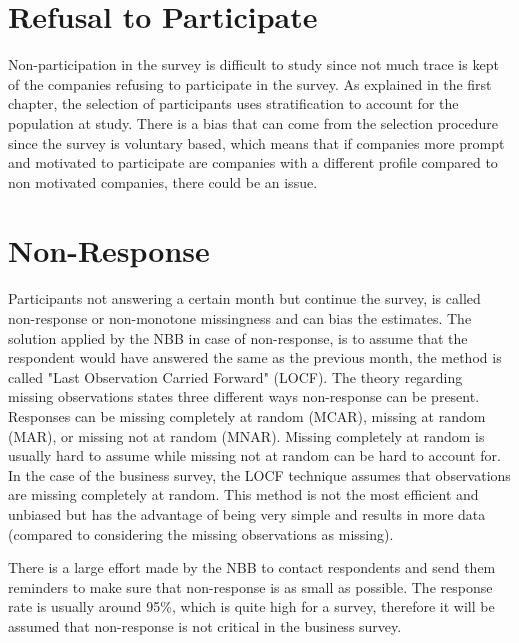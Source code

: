 \documentclass[12pt,a4paper,oneside]{book}
\begin{document}


\section{Refusal to Participate}

Non-participation in the survey is difficult to study since not much trace is kept of the companies refusing to participate in the survey. As explained in the first chapter, the selection of participants uses stratification to account for the population at study.
There is a bias that can come from the selection procedure since the survey is voluntary based, which means that if companies more prompt and motivated to participate are companies with a different profile compared to non motivated companies, there could be an issue.


\section{Non-Response}

Participants not answering a certain month but continue the survey, is called non-response or non-monotone missingness and can bias the estimates.
The solution applied by the NBB in case of non-response, is to assume that the respondent would have answered the same as the previous month, the method is called "Last Observation Carried Forward" (LOCF). 
The theory regarding missing observations states three different ways non-response can be present. Responses can be missing completely at random (MCAR), missing at random (MAR), or missing not at random (MNAR). Missing completely at random is usually hard to assume while missing not at random can be hard to account for.
In the case of the business survey, the LOCF technique assumes that observations are missing completely at random. This method is not the most efficient and unbiased but has the advantage of being very simple and results in more data (compared to considering the missing observations as missing). 

There is a large effort made by the NBB to contact respondents and send them reminders to make sure that non-response is as small as possible.
The response rate is usually around 95\%, which is quite high for a survey, therefore it will be assumed that non-response is not critical in the business survey.
\end{document}
